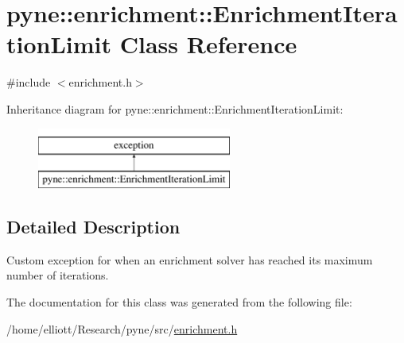 \hypertarget{classpyne_1_1enrichment_1_1_enrichment_iteration_limit}{\section{pyne\-:\-:enrichment\-:\-:Enrichment\-Iteration\-Limit Class Reference}
\label{classpyne_1_1enrichment_1_1_enrichment_iteration_limit}
}


{\ttfamily \#include $<$enrichment.\-h$>$}

Inheritance diagram for pyne\-:\-:enrichment\-:\-:Enrichment\-Iteration\-Limit\-:\begin{figure}[H]
\begin{center}
\leavevmode
\includegraphics[height=2.000000cm]{classpyne_1_1enrichment_1_1_enrichment_iteration_limit}
\end{center}
\end{figure}


\subsection{Detailed Description}
Custom exception for when an enrichment solver has reached its maximum number of iterations. 

The documentation for this class was generated from the following file\-:\begin{DoxyCompactItemize}
\item 
/home/elliott/\-Research/pyne/src/\hyperlink{enrichment_8h}{enrichment.\-h}\end{DoxyCompactItemize}
